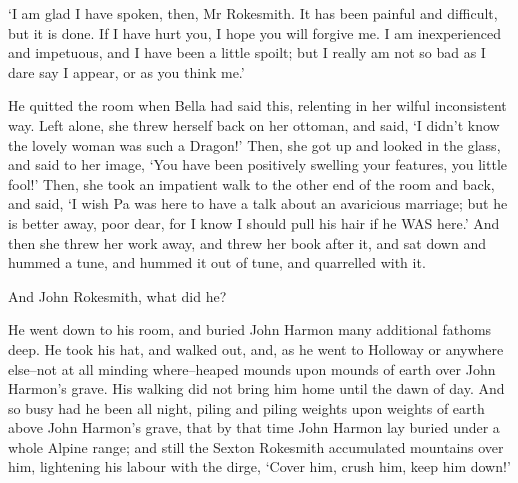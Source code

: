 ‘I am glad I have spoken, then, Mr Rokesmith. It has been painful and
difficult, but it is done. If I have hurt you, I hope you will forgive
me. I am inexperienced and impetuous, and I have been a little spoilt;
but I really am not so bad as I dare say I appear, or as you think me.’

He quitted the room when Bella had said this, relenting in her wilful
inconsistent way. Left alone, she threw herself back on her ottoman, and
said, ‘I didn’t know the lovely woman was such a Dragon!’ Then, she
got up and looked in the glass, and said to her image, ‘You have been
positively swelling your features, you little fool!’ Then, she took an
impatient walk to the other end of the room and back, and said, ‘I
wish Pa was here to have a talk about an avaricious marriage; but he
is better away, poor dear, for I know I should pull his hair if he WAS
here.’ And then she threw her work away, and threw her book after
it, and sat down and hummed a tune, and hummed it out of tune, and
quarrelled with it.

And John Rokesmith, what did he?

He went down to his room, and buried John Harmon many additional fathoms
deep. He took his hat, and walked out, and, as he went to Holloway or
anywhere else--not at all minding where--heaped mounds upon mounds of
earth over John Harmon’s grave. His walking did not bring him home until
the dawn of day. And so busy had he been all night, piling and piling
weights upon weights of earth above John Harmon’s grave, that by that
time John Harmon lay buried under a whole Alpine range; and still the
Sexton Rokesmith accumulated mountains over him, lightening his labour
with the dirge, ‘Cover him, crush him, keep him down!’



